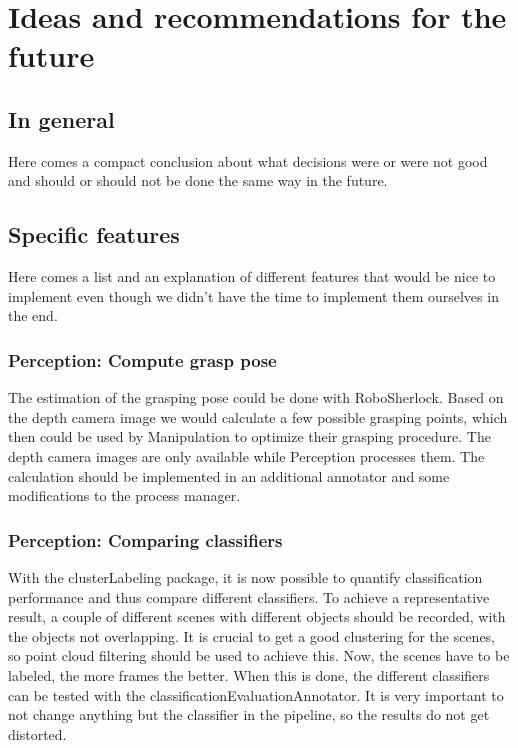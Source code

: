 \documentclass[main.tex]{subfiles}
\begin{document}
	\begingroup

	\renewcommand{\cleardoublepage}{}

	\renewcommand{\clearpage}{}

	\chapter{Ideas and recommendations for the future}
		
		\section{In general}
				\chapterauthor{}
		Here comes a compact conclusion about what decisions were or were not good and should or should not be done the same way in the future.
		
		\section{Specific features}
		Here comes a list and an explanation of different features that would be nice to implement even though we didn't have the time to implement them ourselves in the end.
		
		
		
		\subsection{Perception: Compute grasp pose}
		The estimation of the grasping pose could be done with RoboSherlock. Based on the depth camera image we would calculate a few possible grasping points, which then could be used by Manipulation to optimize their grasping procedure. The depth camera images are only available while Perception processes them. The calculation should be implemented in an additional annotator and some modifications to the process manager.
		
		\subsection{Perception: Comparing classifiers}
		With the clusterLabeling package, it is now possible to quantify classification performance and thus compare different classifiers. To achieve a 					representative result, a couple of different scenes with different objects should be recorded, with the objects not overlapping. It is crucial to get a
		good clustering for the scenes, so point cloud filtering should be used to achieve this. Now, the scenes have to be labeled, the more frames the better. 
		When this is done, the different classifiers can be tested with the classificationEvaluationAnnotator. It is very important to not change anything but 
		the classifier in the pipeline, so the results do not get distorted.
		
\end{document}
